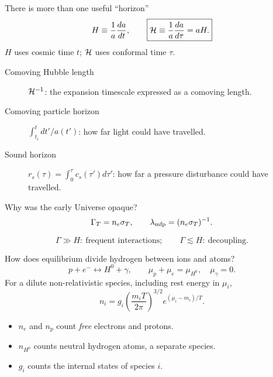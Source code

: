 \begin{frame}{There is more than one useful ``horizon''}
\[
H\equiv\frac1a\frac{da}{dt},\qquad
\boxed{\mathcal H\equiv\frac1a\frac{da}{d\tau}=aH.}
\]
$H$ uses cosmic time $t$; $\mathcal H$ uses conformal time $\tau$.
\medskip
\begin{description}
\item[Comoving Hubble length] $\mathcal H^{-1}$: the expansion timescale expressed as a comoving length.
\item[Comoving particle horizon] $\int_{t_i}^{t}dt'/a(t')$: how far light could have travelled.
\item[Sound horizon] $r_s(\tau)=\int_0^\tau c_s(\tau')d\tau'$: how far a pressure disturbance could have travelled.
\end{description}
\end{frame}

\begin{frame}{Why was the early Universe opaque?}
\[\Gamma_T=n_e\sigma_T,\qquad \lambda_{\rm mfp}=(n_e\sigma_T)^{-1}.\]
\begin{center}
\end{center}
\[\Gamma\gg H:\ \text{frequent interactions};\qquad\Gamma\lesssim H:\ \text{decoupling}.\]
\end{frame}

\begin{frame}{How does equilibrium divide hydrogen between ions and atoms?}
\[p+e^-\leftrightarrow H^0+\gamma,\qquad \mu_p+\mu_e=\mu_{H^0},\quad\mu_\gamma=0.\]
For a dilute non-relativistic species, including rest energy in $\mu_i$,
\[n_i=g_i\left(\frac{m_iT}{2\pi}\right)^{3/2}e^{(\mu_i-m_i)/T}.\]
\begin{itemize}
\item $n_e$ and $n_p$ count \emph{free} electrons and protons.
\item $n_{H^0}$ counts neutral hydrogen atoms, a separate species.
\item $g_i$ counts the internal states of species $i$.
\end{itemize}
\end{frame}

